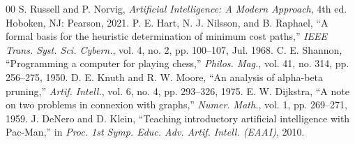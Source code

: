 \documentclass[conference]{IEEEtran}
\begin{document}
\begin{thebibliography}{00}
 S. Russell and P. Norvig, \textit{Artificial Intelligence: A Modern Approach}, 4th ed. Hoboken, NJ: Pearson, 2021.
 P. E. Hart, N. J. Nilsson, and B. Raphael, ``A formal basis for the heuristic determination of minimum cost paths,'' \textit{IEEE Trans. Syst. Sci. Cybern.}, vol. 4, no. 2, pp. 100--107, Jul. 1968.
 C. E. Shannon, ``Programming a computer for playing chess,'' \textit{Philos. Mag.}, vol. 41, no. 314, pp. 256--275, 1950.
 D. E. Knuth and R. W. Moore, ``An analysis of alpha-beta pruning,'' \textit{Artif. Intell.}, vol. 6, no. 4, pp. 293--326, 1975.
 E. W. Dijkstra, ``A note on two problems in connexion with graphs,'' \textit{Numer. Math.}, vol. 1, pp. 269--271, 1959.
 J. DeNero and D. Klein, ``Teaching introductory artificial intelligence with Pac-Man,'' in \textit{Proc. 1st Symp. Educ. Adv. Artif. Intell. (EAAI)}, 2010.
\end{thebibliography}
\end{document}
